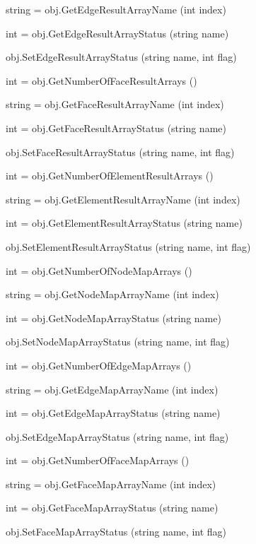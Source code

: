\begin{DoxyItemize}
\item {\ttfamily string = obj.\-Get\-Edge\-Result\-Array\-Name (int index)}  
\item {\ttfamily int = obj.\-Get\-Edge\-Result\-Array\-Status (string name)}  
\item {\ttfamily obj.\-Set\-Edge\-Result\-Array\-Status (string name, int flag)}  
\item {\ttfamily int = obj.\-Get\-Number\-Of\-Face\-Result\-Arrays ()}  
\item {\ttfamily string = obj.\-Get\-Face\-Result\-Array\-Name (int index)}  
\item {\ttfamily int = obj.\-Get\-Face\-Result\-Array\-Status (string name)}  
\item {\ttfamily obj.\-Set\-Face\-Result\-Array\-Status (string name, int flag)}  
\item {\ttfamily int = obj.\-Get\-Number\-Of\-Element\-Result\-Arrays ()}  
\item {\ttfamily string = obj.\-Get\-Element\-Result\-Array\-Name (int index)}  
\item {\ttfamily int = obj.\-Get\-Element\-Result\-Array\-Status (string name)}  
\item {\ttfamily obj.\-Set\-Element\-Result\-Array\-Status (string name, int flag)}  
\item {\ttfamily int = obj.\-Get\-Number\-Of\-Node\-Map\-Arrays ()}  
\item {\ttfamily string = obj.\-Get\-Node\-Map\-Array\-Name (int index)}  
\item {\ttfamily int = obj.\-Get\-Node\-Map\-Array\-Status (string name)}  
\item {\ttfamily obj.\-Set\-Node\-Map\-Array\-Status (string name, int flag)}  
\item {\ttfamily int = obj.\-Get\-Number\-Of\-Edge\-Map\-Arrays ()}  
\item {\ttfamily string = obj.\-Get\-Edge\-Map\-Array\-Name (int index)}  
\item {\ttfamily int = obj.\-Get\-Edge\-Map\-Array\-Status (string name)}  
\item {\ttfamily obj.\-Set\-Edge\-Map\-Array\-Status (string name, int flag)}  
\item {\ttfamily int = obj.\-Get\-Number\-Of\-Face\-Map\-Arrays ()}  
\item {\ttfamily string = obj.\-Get\-Face\-Map\-Array\-Name (int index)}  
\item {\ttfamily int = obj.\-Get\-Face\-Map\-Array\-Status (string name)}  
\item {\ttfamily obj.\-Set\-Face\-Map\-Array\-Status (string name, int flag)}  

\end{DoxyItemize}
